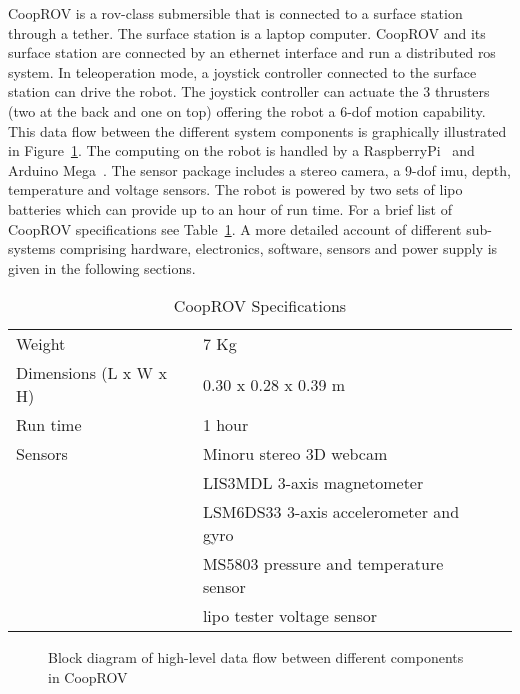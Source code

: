 CoopROV is a \gls{rov}-class submersible that is connected to a surface station through a tether. The surface station is a laptop computer. CoopROV and its surface station are connected by an ethernet interface and run a distributed \gls{ros} system. In teleoperation mode, a joystick controller connected to the surface station can drive the robot. The joystick controller can actuate the 3 thrusters (two at the back and one on top) offering the robot a 6-\gls{dof} motion capability. This data flow between the different system components is graphically illustrated in Figure~\ref{fig:cooprov_dataflow}. The computing on the robot is handled by a RaspberryPi~\cite{raspberrypi} and Arduino Mega~\cite{arduino}. The sensor package includes a stereo camera, a 9-\gls{dof} \gls{imu}, depth, temperature and voltage sensors. The robot is powered by two sets of \gls{lipo} batteries which can provide up to an hour of run time. For a brief list of CoopROV specifications see Table~\ref{tab:cooprov_specs}. A more detailed 
account of 
different sub-systems comprising hardware, electronics, software, sensors and power supply is given in the following sections.
%
\begin{table}	
  \begin{tabular}{lll} 
  \toprule
  Weight			&7 Kg\\
  Dimensions (L x W x H)	&0.30 x 0.28 x 0.39 m\\
  Run time			&1 hour\\
  Sensors			&Minoru stereo 3D webcam \\
				&LIS3MDL 3-axis magnetometer	\\
				&LSM6DS33 3-axis accelerometer and gyro\\
				&MS5803 pressure and temperature sensor\\
				&\gls{lipo} tester voltage sensor\\
  \bottomrule
  \end{tabular}
  \caption{CoopROV Specifications}
  \label{tab:cooprov_specs}
\end{table}
  
\begin{figure} 
  \centering
\caption[CoopROV data-flow diagram]{Block diagram of high-level data flow between different components in CoopROV}
\label{fig:cooprov_dataflow}
\end{figure}


